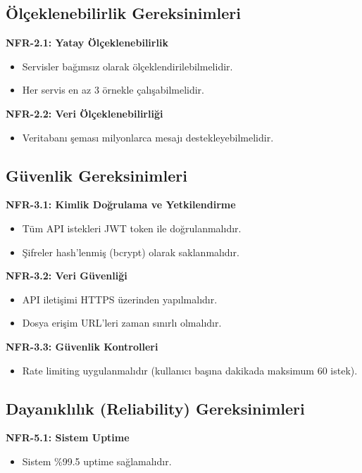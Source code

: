\subsection{Ölçeklenebilirlik Gereksinimleri}
\textbf{NFR-2.1: Yatay Ölçeklenebilirlik}
\begin{itemize}
    \item Servisler bağımsız olarak ölçeklendirilebilmelidir.
    \item Her servis en az 3 örnekle çalışabilmelidir.
\end{itemize}

\textbf{NFR-2.2: Veri Ölçeklenebilirliği}
\begin{itemize}
    \item Veritabanı şeması milyonlarca mesajı destekleyebilmelidir.
\end{itemize}

\subsection{Güvenlik Gereksinimleri}
\textbf{NFR-3.1: Kimlik Doğrulama ve Yetkilendirme}
\begin{itemize}
    \item Tüm API istekleri JWT token ile doğrulanmalıdır.
    \item Şifreler hash'lenmiş (bcrypt) olarak saklanmalıdır.
\end{itemize}

\textbf{NFR-3.2: Veri Güvenliği}
\begin{itemize}
    \item API iletişimi HTTPS üzerinden yapılmalıdır.
    \item Dosya erişim URL'leri zaman sınırlı olmalıdır.
\end{itemize}

\textbf{NFR-3.3: Güvenlik Kontrolleri}
\begin{itemize}
    \item Rate limiting uygulanmalıdır (kullanıcı başına dakikada maksimum 60 istek).
\end{itemize}

\subsection{Dayanıklılık (Reliability) Gereksinimleri}
\textbf{NFR-5.1: Sistem Uptime}
\begin{itemize}
    \item Sistem \%99.5 uptime sağlamalıdır.
\end{itemize}

